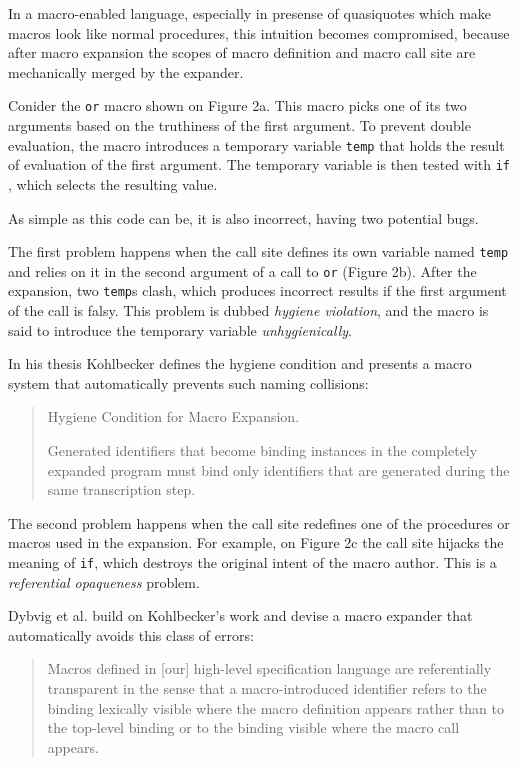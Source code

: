 \documentclass[10pt,journal,a4paper]{IEEEtran}
\begin{document}
In a macro-enabled language, especially in presense of quasiquotes which make
macros look like normal procedures, this intuition becomes compromised,
because after macro expansion the scopes of macro definition and macro call site
are mechanically merged by the expander.

Conider the \small \texttt{or} \normalsize macro shown on Figure 2a. This macro picks one of its two arguments
based on the truthiness of the first argument. To prevent double evaluation, the macro introduces
a temporary variable \small \texttt{temp} \normalsize that holds the result of evaluation of the first argument.
The temporary variable is then tested with \small \texttt{if} \normalsize, which selects the resulting value.

As simple as this code can be, it is also incorrect, having two potential bugs.

The first problem happens when the call site defines its own variable named \small \texttt{temp} \normalsize
and relies on it in the second argument of a call to \small \texttt{or} \normalsize (Figure 2b).
After the expansion, two \small \texttt{temp}\normalsize s clash,
which produces incorrect results if the first argument of the call is falsy.
This problem is dubbed \emph{hygiene violation}, and the macro is said to introduce the temporary
variable \emph{unhygienically}.

In his thesis \cite{kohlbecker86} Kohlbecker defines the hygiene condition
and presents a macro system that automatically prevents such naming collisions:
\begin{quote}
Hygiene Condition for Macro Expansion.

Generated identifiers that become binding instances in the
completely expanded program must bind only identifiers that are
generated during the same transcription step.
\end{quote}

The second problem happens when the call site
redefines one of the procedures or macros used in the expansion. For example, on Figure 2c
the call site hijacks the meaning of \small \texttt{if}\normalsize, which destroys the original intent of the
macro author. This is a \emph{referential opaqueness} problem.

Dybvig et al. \cite{dybvig92} build on Kohlbecker's work and devise a macro expander that
automatically avoids this class of errors:
\begin{quote}
Macros defined in [our] high-level specification language are
referentially transparent in the sense that a macro-introduced
identifier refers to the binding lexically visible where the macro
definition appears rather than to the top-level binding or to the
binding visible where the macro call appears.
\end{quote}
\end{document}
